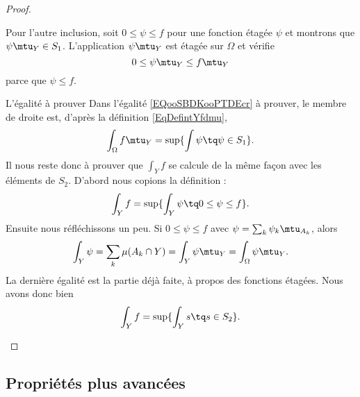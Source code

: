 \begin{proof}
\begin{subproof}
            Pour l'autre inclusion, soit \( 0\leq \psi\leq f\) pour une fonction étagée \( \psi\) et montrons que \( \psi\mtu_Y\in S_1\). L'application \( \psi\mtu_Y\) est étagée sur \( \Omega\) et vérifie
            \begin{equation}
                0\leq \psi\mtu_Y\leq f\mtu_Y
            \end{equation}
            parce que \( \psi\leq f\).
        \item[L'égalité à prouver]
            Dans l'égalité \ref{EQooSBDKooPTDEcr} à prouver, le membre de droite est, d'après la définition \ref{EqDefintYfdmu},
            \begin{equation}
                \int_{\Omega}f\mtu_Y=\sup\{ \int\psi\tq \psi\in S_1 \}.
            \end{equation}
            Il nous reste donc à prouver que \(  \int_Yf\) se calcule de la même façon avec les éléments de \( S_2\). D'abord nous copions la définition :
            \begin{equation}
                \int_Yf=\sup\{ \int_Y\psi\tq 0\leq \psi\leq f \}.
            \end{equation}
            Ensuite nous réfléchissons un peu. Si \( 0\leq \psi\leq f\) avec \( \psi=\sum_k\psi_k\mtu_{A_k}\), alors
            \begin{equation}
                \int_Y\psi=\sum_k\mu(A_k\cap Y)=\int_Y\psi\mtu_{Y}=\int_{\Omega}\psi\mtu_Y.
            \end{equation}
            La dernière égalité est la partie déjà faite, à propos des fonctions étagées. Nous avons donc bien
            \begin{equation}
                \int_Yf=\sup\{ \int_Ys\tq s\in S_2 \}.
            \end{equation}
    \end{subproof}
\end{proof}

\subsection{Propriétés plus avancées}

